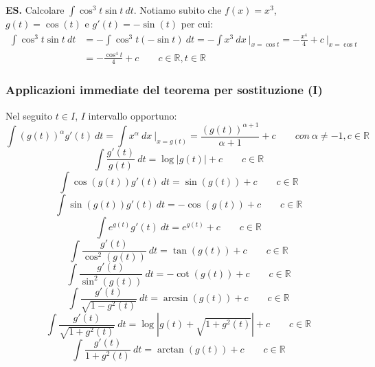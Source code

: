 \documentclass{article}
\begin{document}
\noindent\textbf{ES.} Calcolare $\int \cos^3t\sin t \ dt$.
Notiamo subito che $f(x) = x^3$, $g(t) = \cos(t)$ e $g'(t) = -\sin(t)$ per cui:
\begin{align*}
    \int \cos^3t\sin t \ dt &= - \int \cos^3t (-\sin t) \ dt = -\int x^3 \ dx \ \bigg|_{x = \cos t} = -\frac{x^4}{4} + c \ \bigg|_{x = \cos t} \\
    &= -\frac{\cos^4 t}{4} + c \qquad c \in \mathbb{R}, t \in \mathbb{R}
\end{align*}

\subsubsection{Applicazioni immediate del teorema per sostituzione (I)}
Nel seguito $t \in I$, $I$ intervallo opportuno:
\begin{equation*}
    \int (g(t))^\alpha g'(t) \ dt = \int x^\alpha \ dx \ \bigg|_{x = g(t)} = \frac{(g(t))^{\alpha + 1}}{\alpha + 1} + c \qquad con \ \alpha \neq -1, c \in \mathbb{R}
\end{equation*}
\begin{equation*}
    \int \frac{g'(t)}{g(t)} \ dt = \log|g(t)| + c \qquad c \in \mathbb{R}
\end{equation*}
\begin{equation*}
    \int \cos(g(t))g'(t) \ dt = \sin(g(t)) + c \qquad c \in \mathbb{R}
\end{equation*}
\begin{equation*}
    \int \sin(g(t))g'(t) \ dt = -\cos(g(t)) + c \qquad c \in \mathbb{R}
\end{equation*}
\begin{equation*}
    \int e^{g(t)}g'(t) \ dt = e^{g(t)} + c \qquad c \in \mathbb{R}
\end{equation*}
\begin{equation*}
    \int \frac{g'(t)}{\cos^2(g(t))} \ dt = \tan(g(t)) + c \qquad c \in \mathbb{R}
\end{equation*}
\begin{equation*}
    \int \frac{g'(t)}{\sin^2(g(t))} \ dt = -\cot(g(t)) + c \qquad c \in \mathbb{R}
\end{equation*}
\begin{equation*}
    \int \frac{g'(t)}{\sqrt{1 - g^2(t)}} \ dt = \arcsin(g(t)) + c \qquad c \in \mathbb{R}
\end{equation*}
\begin{equation*}
    \int \frac{g'(t)}{\sqrt{1 + g^2(t)}} \ dt = \log|g(t) + \sqrt{1 + g^2(t)}| + c \qquad c \in \mathbb{R}
\end{equation*}
\begin{equation*}
    \int \frac{g'(t)}{1 + g^2(t)} \ dt = \arctan(g(t)) + c \qquad c \in \mathbb{R}
\end{equation*}
\end{document}
